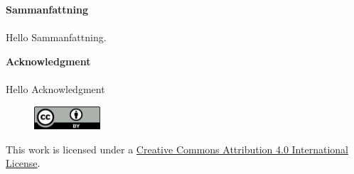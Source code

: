 \documentclass[a4paper,11pt]{report}
\begin{document}
\newpage\null\thispagestyle{empty}\newpage

\thispagestyle{plain}
{}
\huge{\textbf{Sammanfattning}} \\
\normalsize \\
Hello Sammanfattning.
\clearpage

\newpage\null\thispagestyle{empty}\newpage

\thispagestyle{plain}
{}
\huge{\textbf{Acknowledgment}} \\
\normalsize \\
Hello Acknowledgment
\clearpage

\newpage\null\thispagestyle{empty}\newpage

\tableofcontents
\null
\vfill
\begin{figure}
\vspace{-30pt}
  \begin{center}
	\includegraphics[width=0.22\textwidth]{cc-by}
  \end{center}
\end{figure}
\noindent
{\large This work is licensed under a \href{http://creativecommons.org/licenses/by/4.0/}{Creative Commons Attribution 4.0 International License}.}


\glsnogroupskiptrue
\renewcommand{\glsnamefont}[1]{\textbf{#1}}
\setlength{\glsdescwidth}{0.8\hsize}
\printglossary[style=long,title=List of Abbreviations,type=\acronymtype]
\clearpage

\listoffigures
\clearpage
{}
\listoftables
\clearpage












\printbibliography[title={References}]

\appendix

\end{document}
